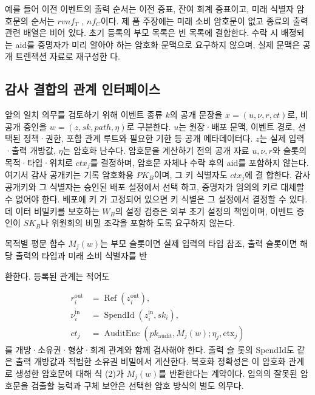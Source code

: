 예를 들어 이전 이벤트의 출력 순서는 이전 증표, 잔여 회계
증표이고, 미래 식별자 암호문의 순서는 \(rvnf_{T}\) , \(nf_{C}\)이다. 제
품 주장에는 미래 소비 암호문이 없고 종료의 출력 관련 배열은
비어 있다. 초기 등록의 부모 목록은 빈 목록에 결합한다. 수락
시 배정되는 aid를 증명자가 미리 알아야 하는 암호화 문맥으로
요구하지 않으며, 실제 문맥은 공개 트랜잭션 자료로 재구성한
다.

\subsection{감사 결합의 관계 인터페이스}
앞의 일치 의무를 검토하기 위해 이벤트 종류 \(k\)의 공개 문장을
\(x=(u,ν,r,ct)\)로, 비공개 증인을 \(w=(z,sk,path,η)\)로
구분한다. \(u\)는 원장·배포 문맥, 이벤트 경로, 선택된 정책·권한,
포함 관계 루트와 필요한 기한 등 공개 메타데이터다. \(z\)는 실제
입력·출력 개방값, \(η\)는 암호화 난수다. 암호문을 계산하기 전의
공개 자료 \(u,ν,r\)와 슬롯의 목적·타입·위치로 \(ctx_{j}\)를 결정하며,
암호문 자체나 수락 후의 aid를 포함하지 않는다. 여기서 감사
공개키는 기록 암호화용 \(PK_{B}\)이며, 그 키 식별자도 \(ctx_{j}\)에 결
합한다. 감사 공개키와 그 식별자는 승인된 배포 설정에서 선택
하고, 증명자가 임의의 키로 대체할 수 없어야 한다. 배포에 키
가 고정되어 있으면 키 식별은 그 설정에서 결정할 수 있다. 데
이터 비밀키를 보호하는 \(W_{B}\)의 설정 검증은 외부 초기 설정의
책임이며, 이벤트 증인이 \(SK_{B}\)나 위원회의 비밀 조각을 포함하
도록 요구하지 않는다.

목적별 평문 함수 \(M_{j}(w)\)는 부모 슬롯이면 실제 입력의 타입
참조, 출력 슬롯이면 해당 출력의 타입과 미래 소비 식별자를 반

환한다. 등록된 관계는 적어도

\begin{equation}
    \begin{aligned}r_i^{\mathrm{out}}&=\operatorname{Ref}(z_i^{\mathrm{out}}),\\\nu_i^{\mathrm{in}}&=\operatorname{SpendId}(z_i^{\mathrm{in}},sk_i),\\ct_j&=\operatorname{AuditEnc}(pk_{\mathrm{audit}},M_j(w);\eta_j,\mathrm{ctx}_j)\end{aligned}\tag{11}
\end{equation}
를 개방·소유권·형상·회계 관계와 함께 검사해야 한다. 출력 슬
롯의 SpendId도 같은 출력 개방값과 적법한 소유권 비밀에서
계산한다. 복호화 정확성은 이 암호화 관계로 생성한 암호문에
대해 식 (2)가 \(M_{j}(w)\)를 반환한다는 계약이다. 임의의 잘못된
암호문을 검출할 능력과 구체 보안은 선택한 암호 방식의 별도
의무다.

